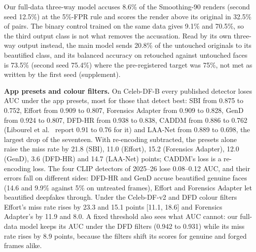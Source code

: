 \documentclass[conference]{IEEEtran}
\begin{document}
Our full-data three-way model accuses 8.6\% of the Smoothing-90 renders (second seed 12.5\%) at the 5\%-FPR rule and
scores the render above its original in 32.5\% of pairs. The binary control trained on the same data gives 9.1\% and
70.5\%, so the third output class is not what removes the accusation. Read by its own three-way output instead, the
main model sends 20.8\% of the untouched originals to its beautified class, and its balanced accuracy on retouched
against untouched faces is 73.5\% (second seed 75.4\%) where the pre-registered target was 75\%, not met as written by
the first seed (supplement).

\textbf{App presets and colour filters.} On Celeb-DF-B every published detector loses AUC under the app presets, most
for those that detect best: SBI from 0.875 to 0.752, Effort from 0.909 to 0.807, Forensics Adapter from 0.909 to 0.828,
GenD from 0.924 to 0.807, DFD-HR from 0.938 to 0.838, CADDM from 0.886 to 0.762 (Libourel et al.~\cite{libourel2024}
report 0.91 to 0.76 for it) and LAA-Net from 0.889 to 0.698, the largest drop of the seventeen. With re-encoding
subtracted, the presets alone raise the miss rate by 21.8 (SBI), 11.0 (Effort), 15.2 (Forensics Adapter), 12.0 (GenD),
3.6 (DFD-HR) and 14.7 (LAA-Net) points; CADDM's loss is a re-encoding loss. The four CLIP detectors of 2025--26 lose
0.08--0.12 AUC, and their errors fall on different sides: DFD-HR and GenD accuse beautified genuine faces (14.6 and
9.9\% against 5\% on untreated frames), Effort and Forensics Adapter let beautified deepfakes through. Under the
Celeb-DF-v2 and DFD colour filters Effort's miss rate rises by 23.3 and 15.1 points [11.1, 18.6] and Forensics
Adapter's by 11.9 and 8.0. A fixed threshold also sees what AUC cannot: our full-data model keeps its AUC under the DFD filters (0.942 to
0.931) while its miss rate rises by 8.9 points, because the filters shift its scores for genuine and forged frames
alike.
\end{document}
